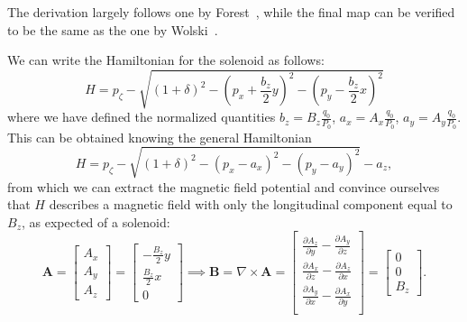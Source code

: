 The derivation largely follows one by Forest~\cite{forest99}, while the final map can be verified to be the same as the one by Wolski~\cite{wolski2014beam}.

We can write the Hamiltonian for the solenoid as follows:
\begin{equation}
  H = p_\zeta -\sqrt{\left(1 + \delta \right)^2 - \left(p_x + \frac{b_z}{2}y\right)^2 - \left(p_y - \frac{b_z}{2}x\right)^2}
\end{equation}
where we have defined the normalized quantities $b_z = B_z\frac{q_0}{P_0}$, $a_x = A_x\frac{q_0}{P_0}$, $a_y = A_y\frac{q_0}{P_0}$.
This can be obtained knowing the general Hamiltonian
\begin{equation}
  H = p_\zeta -\sqrt{(1 + \delta)^2 - (p_x - a_x)^2 - (p_y - a_y)^2} - a_z,
\end{equation}
from which we can extract the magnetic field potential and convince ourselves that $H$ describes a magnetic field with only the longitudinal component equal to $B_z$, as expected of a solenoid:
\begin{equation}
  \mathbf{A} =
  \begin{bmatrix}
    A_x \\ A_y \\ A_z
  \end{bmatrix}
  = \begin{bmatrix}
    -\frac{B_z}{2}y\\
    \frac{B_z}{2}x\\
    0
  \end{bmatrix}
  \implies
  \mathbf{B} = \nabla \times \mathbf{A}
  = \begin{bmatrix}
    \frac{\partial A_z}{\partial y} - \frac{\partial A_y}{\partial z}\\
    \frac{\partial A_x}{\partial z} - \frac{\partial A_z}{\partial x}\\
    \frac{\partial A_y}{\partial x} - \frac{\partial A_x}{\partial y}\\
  \end{bmatrix}
  = \begin{bmatrix}
    0\\
    0\\
    B_z
  \end{bmatrix}.
\end{equation}

